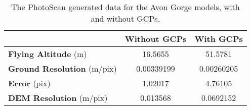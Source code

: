 \begin{table}
    \begin{tabular}{| l | c | c |}
        \hline
        & \textbf{Without GCPs} & \textbf{With GCPs} \\
        \hline
        \textbf{Flying Altitude} (m)       & 16.5655    & 51.5781    \\
        \textbf{Ground Resolution} (m/pix) & 0.00339199 & 0.00260205 \\
        \textbf{Error} (pix)               & 1.02017    & 4.76105    \\
        \textbf{DEM Resolution} (m/pix)    & 0.013568   & 0.0692152  \\
        \hline
    \end{tabular}
    \caption{The PhotoScan generated data for the Avon Gorge models, with and
    without GCPs.}
    \label{tab:avon-gorge}
\end{table}
